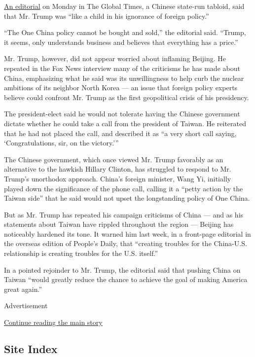 \href{http://opinion.huanqiu.com/editorial/2016-12/9797239.html}{An
editorial} on Monday in The Global Times, a Chinese state-run tabloid,
said that Mr. Trump was ``like a child in his ignorance of foreign
policy.''

``The One China policy cannot be bought and sold,'' the editorial said.
``Trump, it seems, only understands business and believes that
everything has a price.''

Mr. Trump, however, did not appear worried about inflaming Beijing. He
repeated in the Fox News interview many of the criticisms he has made
about China, emphasizing what he said was its unwillingness to help curb
the nuclear ambitions of its neighbor North Korea --- an issue that
foreign policy experts believe could confront Mr. Trump as the first
geopolitical crisis of his presidency.

The president-elect said he would not tolerate having the Chinese
government dictate whether he could take a call from the president of
Taiwan. He reiterated that he had not placed the call, and described it
as ``a very short call saying, `Congratulations, sir, on the victory.'''

The Chinese government, which once viewed Mr. Trump favorably as an
alternative to the hawkish Hillary Clinton, has struggled to respond to
Mr. Trump's unorthodox approach. China's foreign minister, Wang Yi,
initially played down the significance of the phone call, calling it a
``petty action by the Taiwan side'' that he said would not upset the
longstanding policy of One China.

But as Mr. Trump has repeated his campaign criticisms of China --- and
as his statements about Taiwan have rippled throughout the region ---
Beijing has noticeably hardened its tone. It warned him last week, in a
front-page editorial in the overseas edition of People's Daily, that
``creating troubles for the China-U.S. relationship is creating troubles
for the U.S. itself.''

In a pointed rejoinder to Mr. Trump, the editorial said that pushing
China on Taiwan ``would greatly reduce the chance to achieve the goal of
making America great again.''

Advertisement

\protect\hyperlink{after-bottom}{Continue reading the main story}

\hypertarget{site-index}{%
\subsection{Site Index}\label{site-index}}

